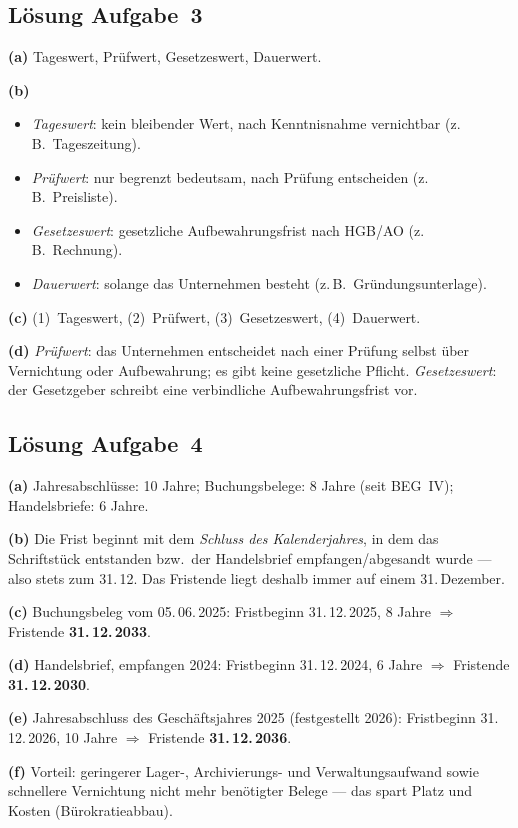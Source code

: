 \documentclass[11pt, a4paper]{article}
\begin{document}
\subsection*{Lösung Aufgabe~3}
\begin{loesung}
\textbf{(a)} Tageswert, Prüfwert, Gesetzeswert, Dauerwert.

\textbf{(b)}
\begin{itemize}[itemsep=0pt]
  \item \emph{Tageswert}: kein bleibender Wert, nach Kenntnisnahme vernichtbar (z.\,B.\ Tageszeitung).
  \item \emph{Prüfwert}: nur begrenzt bedeutsam, nach Prüfung entscheiden (z.\,B.\ Preisliste).
  \item \emph{Gesetzeswert}: gesetzliche Aufbewahrungsfrist nach HGB/AO (z.\,B.\ Rechnung).
  \item \emph{Dauerwert}: solange das Unternehmen besteht (z.\,B.\ Gründungsunterlage).
\end{itemize}

\textbf{(c)} (1)~Tageswert, (2)~Prüfwert, (3)~Gesetzeswert, (4)~Dauerwert.

\textbf{(d)} \emph{Prüfwert}: das Unternehmen entscheidet nach einer Prüfung selbst über
Vernichtung oder Aufbewahrung; es gibt keine gesetzliche Pflicht. \emph{Gesetzeswert}:
der Gesetzgeber schreibt eine verbindliche Aufbewahrungsfrist vor.
\end{loesung}

\subsection*{Lösung Aufgabe~4}
\begin{loesung}
\textbf{(a)} Jahresabschlüsse: 10 Jahre; Buchungsbelege: 8 Jahre (seit BEG~IV);
Handelsbriefe: 6 Jahre.

\textbf{(b)} Die Frist beginnt mit dem \emph{Schluss des Kalenderjahres}, in dem das
Schriftstück entstanden bzw.\ der Handelsbrief empfangen/abgesandt wurde --- also stets
zum 31.\,12. Das Fristende liegt deshalb immer auf einem 31.\,Dezember.

\textbf{(c)} Buchungsbeleg vom 05.\,06.\,2025: Fristbeginn 31.\,12.\,2025, 8 Jahre $\Rightarrow$
Fristende \textbf{31.\,12.\,2033}.

\textbf{(d)} Handelsbrief, empfangen 2024: Fristbeginn 31.\,12.\,2024, 6 Jahre $\Rightarrow$
Fristende \textbf{31.\,12.\,2030}.

\textbf{(e)} Jahresabschluss des Geschäftsjahres 2025 (festgestellt 2026): Fristbeginn
31.\,12.\,2026, 10 Jahre $\Rightarrow$ Fristende \textbf{31.\,12.\,2036}.

\textbf{(f)} Vorteil: geringerer Lager-, Archivierungs- und Verwaltungsaufwand sowie
schnellere Vernichtung nicht mehr benötigter Belege --- das spart Platz und Kosten
(Bürokratieabbau).
\end{loesung}
\end{document}
